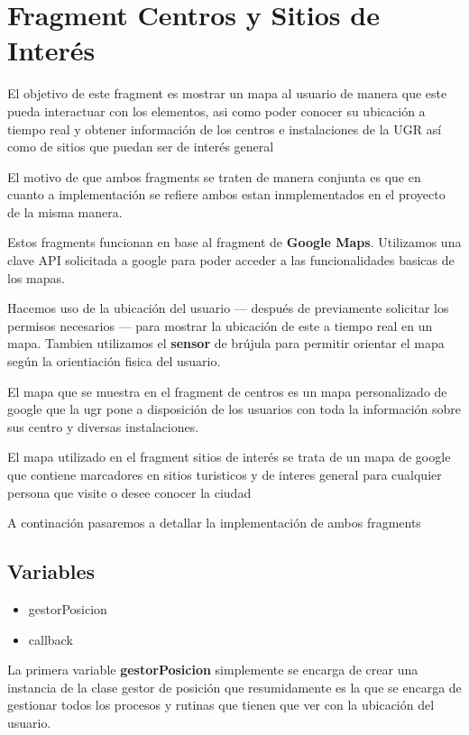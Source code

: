 \section{Fragment Centros y Sitios de Interés}
El objetivo de este fragment es mostrar un mapa al usuario de manera que este pueda interactuar con los elementos, asi como poder conocer su ubicación a tiempo real y obtener información de los centros e instalaciones de la UGR así como de sitios que puedan ser de interés general

El motivo de que ambos fragments se traten de manera conjunta es que en cuanto a implementación se refiere ambos estan inmplementados en el proyecto de la misma manera.

Estos fragments funcionan en base al fragment de \textbf{Google Maps}. Utilizamos una clave API solicitada a google para poder acceder a las funcionalidades basicas de los mapas.

Hacemos uso de la ubicación del usuario --- después de previamente solicitar los permisos necesarios --- para mostrar la ubicación de este a tiempo real en un mapa. Tambien utilizamos el \textbf{sensor} de brújula para permitir orientar el mapa según la orientiación fisica del usuario.

El mapa que se muestra en el fragment de centros es un mapa personalizado de google que la ugr pone a disposición de los usuarios con toda la información sobre sus centro y diversas instalaciones.

El mapa utilizado en el fragment sitios de interés se trata de un mapa de google que contiene marcadores en sitios turisticos y de interes general para cualquier persona que visite o desee conocer la ciudad

A continación pasaremos a detallar la implementación de ambos fragments

\subsection{Variables}

\begin{itemize}
	\item gestorPosicion
	\item callback
\end{itemize}

La primera variable \textbf{gestorPosicion} simplemente se encarga de crear una instancia de la clase gestor de posición que resumidamente es la que se encarga de gestionar todos los procesos y rutinas que tienen que ver con la ubicación del usuario.

